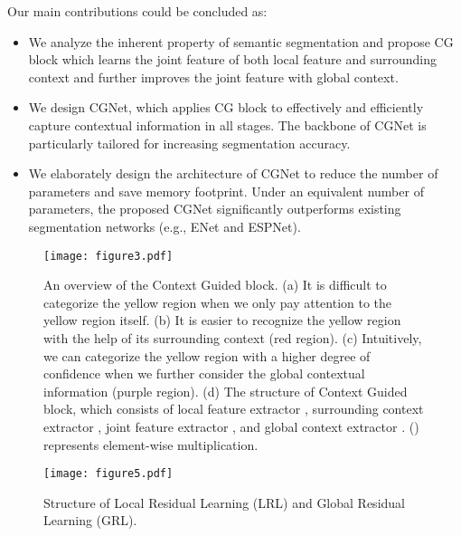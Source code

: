 \documentclass[10pt,twocolumn,letterpaper]{article}
\begin{document}
Our main contributions could be concluded as:
\begin{itemize}
\item We analyze the inherent property of semantic segmentation and propose CG block which learns the joint feature of both local feature and surrounding context and further improves the joint feature with global context.
\item We design CGNet, which applies CG block to effectively and efficiently capture contextual information in all stages. The backbone of CGNet is particularly tailored for increasing segmentation accuracy.
\item We elaborately design the architecture of CGNet to reduce the number of parameters and save memory footprint. Under an equivalent number of parameters, the proposed CGNet significantly outperforms existing segmentation networks (e.g., ENet and ESPNet).
\end{itemize}

































\begin{figure*}[t]
\centering
\texttt{[image: figure3.pdf]}
\caption{An overview of the Context Guided block. (a) It is difficult to categorize the yellow region when we only pay attention to the yellow region itself. (b) It is easier to recognize the yellow region with the help of its surrounding context (red region). (c) Intuitively, we can categorize the yellow region with a higher degree of confidence when we further consider the global contextual information (purple region). (d) The structure of Context Guided block, which consists of local feature extractor , surrounding context extractor , joint feature extractor , and global context extractor . () represents element-wise multiplication.}
\label{fig:fig3}
\end{figure*}

\begin{figure}[t]
\centering
\texttt{[image: figure5.pdf]}
\caption{Structure of Local Residual Learning (LRL) and Global Residual Learning (GRL).}
\label{fig:fig6}
\vspace{-15pt}
\end{figure}
\end{document}
